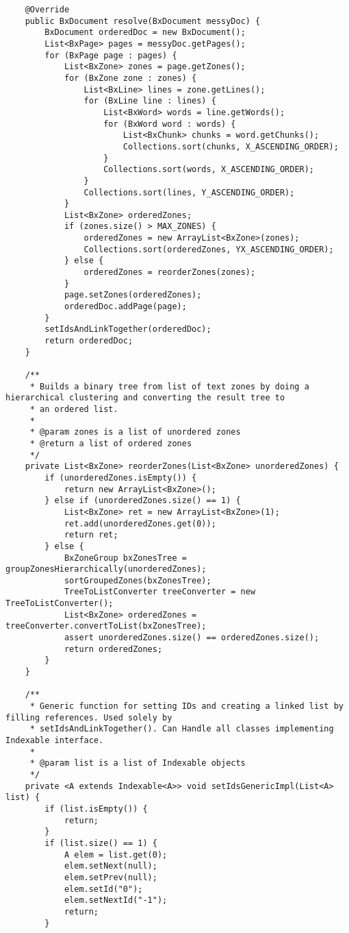 \begin{appendices}
\begin{lstlisting}
    @Override
    public BxDocument resolve(BxDocument messyDoc) {
        BxDocument orderedDoc = new BxDocument();
        List<BxPage> pages = messyDoc.getPages();
        for (BxPage page : pages) {
            List<BxZone> zones = page.getZones();
            for (BxZone zone : zones) {
                List<BxLine> lines = zone.getLines();
                for (BxLine line : lines) {
                    List<BxWord> words = line.getWords();
                    for (BxWord word : words) {
                        List<BxChunk> chunks = word.getChunks();
                        Collections.sort(chunks, X_ASCENDING_ORDER);
                    }
                    Collections.sort(words, X_ASCENDING_ORDER);
                }
                Collections.sort(lines, Y_ASCENDING_ORDER);
            }
            List<BxZone> orderedZones;
            if (zones.size() > MAX_ZONES) {
                orderedZones = new ArrayList<BxZone>(zones);
                Collections.sort(orderedZones, YX_ASCENDING_ORDER);
            } else {
                orderedZones = reorderZones(zones);
            }
            page.setZones(orderedZones);
            orderedDoc.addPage(page);
        }
        setIdsAndLinkTogether(orderedDoc);
        return orderedDoc;
    }

    /**
     * Builds a binary tree from list of text zones by doing a hierarchical clustering and converting the result tree to
     * an ordered list.
     *
     * @param zones is a list of unordered zones
     * @return a list of ordered zones
     */
    private List<BxZone> reorderZones(List<BxZone> unorderedZones) {
        if (unorderedZones.isEmpty()) {
            return new ArrayList<BxZone>();
        } else if (unorderedZones.size() == 1) {
            List<BxZone> ret = new ArrayList<BxZone>(1);
            ret.add(unorderedZones.get(0));
            return ret;
        } else {
            BxZoneGroup bxZonesTree = groupZonesHierarchically(unorderedZones);
            sortGroupedZones(bxZonesTree);
            TreeToListConverter treeConverter = new TreeToListConverter();
            List<BxZone> orderedZones = treeConverter.convertToList(bxZonesTree);
            assert unorderedZones.size() == orderedZones.size();
            return orderedZones;
        }
    }

    /**
     * Generic function for setting IDs and creating a linked list by filling references. Used solely by
     * setIdsAndLinkTogether(). Can Handle all classes implementing Indexable interface.
     *
     * @param list is a list of Indexable objects
     */
    private <A extends Indexable<A>> void setIdsGenericImpl(List<A> list) {
        if (list.isEmpty()) {
            return;
        }
        if (list.size() == 1) {
            A elem = list.get(0);
            elem.setNext(null);
            elem.setPrev(null);
            elem.setId("0");
            elem.setNextId("-1");
            return;
        }


\end{lstlisting}
\end{appendices}
